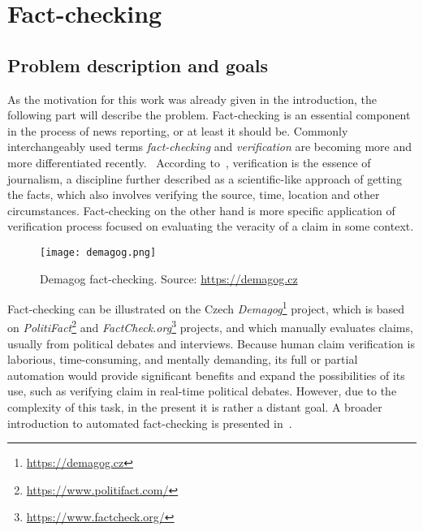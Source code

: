 \chapter{Fact-checking}
\label{chapter:fact-checking}

    \section{Problem description and goals}
    \label{section:problem-desc}
    As the motivation for this work was already given in the introduction, the following part will describe the problem. Fact-checking is an essential component in the process of news reporting, or at least it should be. Commonly interchangeably used terms \emph{fact-checking} and \emph{verification} are becoming more and more differentiated recently.~\parencite{fact-checking-vs-verification} According to~\parencite{kovach2007elements}, verification is the essence of journalism, a discipline further described as a scientific-like approach of getting the facts, which also involves verifying the source, time, location and other circumstances. Fact-checking on the other hand is more specific application of verification process focused on evaluating the veracity of a claim in some context.
    
    \begin{figure}[ht]
        \label{fig:demagog}
        \texttt{[image: demagog.png]}
        \centering
        \caption[Demagog fact-checking]{Demagog fact-checking. Source: \url{https://demagog.cz}}
    \end{figure}

    Fact-checking can be illustrated on the Czech \emph{Demagog}\footnote{\url{https://demagog.cz}} project, which is based on \emph{PolitiFact}\footnote{\url{https://www.politifact.com/}} and \emph{FactCheck.org}\footnote{\url{https://www.factcheck.org/}} projects, and which manually evaluates claims, usually from political debates and interviews. Because human claim verification is laborious, time-consuming, and mentally demanding, its full or partial automation would provide significant benefits and expand the possibilities of its use, such as verifying claim in real-time political debates. However, due to the complexity of this task, in the present it is rather a distant goal. A broader introduction to automated fact-checking is presented in~\parencite{thorne-vlachos-2018-automated}.


